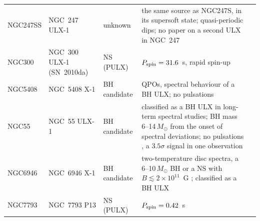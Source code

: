 \begin{table}
\begin{tabular}{@{}lp{}p{}p{}p{}@{}}
NGC247SS & NGC~247 ULX-1\idq{} & unknown & the same source as NGC247S, in its supersoft state; quasi-periodic dips; no paper on a second ULX in NGC~247 & \citealt{DAi2021, Alston2021} \\
NGC300 & NGC~300 ULX-1 (SN~2010da) & NS (PULX) & $P_{\rm spin} = 31.6$~s, rapid spin-up & \citealt{Carpano2018} \\
NGC5408 & NGC~5408 X-1 & BH candidate & QPOs, spectral behaviour of a BH ULX; no pulsations & \citealt{Majumder2023} \\
NGC55 & NGC~55 ULX-1 & BH candidate & classified as a BH ULX in long-term spectral studies; BH mass 6--14\,$M_\odot$ from the onset of spectral deviations; no pulsations \citep{Jithesh2022}, a $3.5\sigma$ signal in one observation \citep{Sathyaprakash2026} & \citealt{Majumder2025, Jithesh2022, Barra2022, Sathyaprakash2026} \\
NGC6946 & NGC~6946 X-1 & BH candidate & two-temperature disc spectra, a 6--10\,$M_\odot$ BH or a NS with $B \lesssim 2\times10^{11}$~G \citep{Ghosh2023}; classified as a BH ULX \citep{Majumder2023} & \citealt{Ghosh2023, Majumder2023} \\
NGC7793 & NGC~7793 P13 & NS (PULX) & $P_{\rm spin} = 0.42$~s & \citealt{Furst2016, Israel2017} \\
\bottomrule
\end{tabular}
\end{table}

